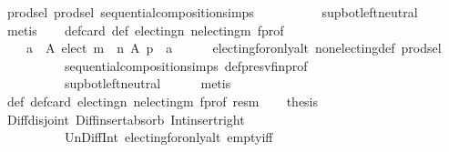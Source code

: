 \begin{isabellebody}
\ prod{\isachardot}{\kern0pt}sel{\isacharparenleft}{\kern0pt}{}{\isacharparenright}{\kern0pt}\ prod{\isachardot}{\kern0pt}sel{\isacharparenleft}{\kern0pt}{}{\isacharparenright}{\kern0pt}\ sequential{\isacharunderscore}{\kern0pt}composition{\isachardot}{\kern0pt}simps\isanewline
\ \ \ \ \ \ \ \ \ \ sup{\isacharunderscore}{\kern0pt}bot{\isachardot}{\kern0pt}left{\isacharunderscore}{\kern0pt}neutral\isanewline
\ \ \ \ \isamarkupfalse%
\ metis\isanewline
\ \ \isamarkupfalse%
\ def{\isacharunderscore}{\kern0pt}card\ def\ electing{\isacharunderscore}{\kern0pt}n\ n{\isacharunderscore}{\kern0pt}electing{\isacharunderscore}{\kern0pt}m\ f{\isacharunderscore}{\kern0pt}prof\ \isamarkupfalse%
\isanewline
\ \ \ \ {\isachardoublequoteopen}{\isasymexists}a\ {\isasymin}\ A{\isachardot}{\kern0pt}\ elect\ {\isacharparenleft}{\kern0pt}m\ {\isasymtriangleright}\ n{\isacharparenright}{\kern0pt}\ A\ p\ {\isacharequal}{\kern0pt}\ {\isacharbraceleft}{\kern0pt}a{\isacharbraceright}{\kern0pt}{\isachardoublequoteclose}\isanewline
\ \ \ \ \isamarkupfalse%
\ electing{\isacharunderscore}{\kern0pt}for{\isacharunderscore}{\kern0pt}only{\isacharunderscore}{\kern0pt}alt\ non{\isacharunderscore}{\kern0pt}electing{\isacharunderscore}{\kern0pt}def\ prod{\isachardot}{\kern0pt}sel\isanewline
\ \ \ \ \ \ \ \ \ \ sequential{\isacharunderscore}{\kern0pt}composition{\isachardot}{\kern0pt}simps\ def{\isacharunderscore}{\kern0pt}presv{\isacharunderscore}{\kern0pt}fin{\isacharunderscore}{\kern0pt}prof\isanewline
\ \ \ \ \ \ \ \ \ \ sup{\isacharunderscore}{\kern0pt}bot{\isachardot}{\kern0pt}left{\isacharunderscore}{\kern0pt}neutral\isanewline
\ \ \ \ \isamarkupfalse%
\ metis\isanewline
\ \ \isamarkupfalse%
\ def\ def{\isacharunderscore}{\kern0pt}card\ electing{\isacharunderscore}{\kern0pt}n\ n{\isacharunderscore}{\kern0pt}electing{\isacharunderscore}{\kern0pt}m\ f{\isacharunderscore}{\kern0pt}prof\ res{\isacharunderscore}{\kern0pt}m\isanewline
\ \ \isamarkupfalse%
\ {\isacharquery}{\kern0pt}thesis\isanewline
\ \ \ \ \isamarkupfalse%
\ Diff{\isacharunderscore}{\kern0pt}disjoint\ Diff{\isacharunderscore}{\kern0pt}insert{\isacharunderscore}{\kern0pt}absorb\ Int{\isacharunderscore}{\kern0pt}insert{\isacharunderscore}{\kern0pt}right\isanewline
\ \ \ \ \ \ \ \ \ \ Un{\isacharunderscore}{\kern0pt}Diff{\isacharunderscore}{\kern0pt}Int\ electing{\isacharunderscore}{\kern0pt}for{\isacharunderscore}{\kern0pt}only{\isacharunderscore}{\kern0pt}alt\ empty{\isacharunderscore}{\kern0pt}iff\isanewline

\end{isabellebody}
